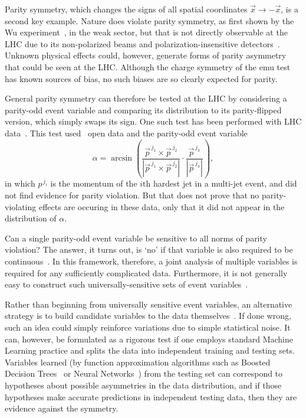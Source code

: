Parity symmetry, which changes the signs of all spatial coordinates
$\vec x\rightarrow -\vec x$, is a second key example.
Nature does violate parity symmetry, as first shown by the Wu
experiment~\cite{PhysRev.105.1413}, in the weak sector, but that is not
directly observable at the LHC due to its non-polarized beams and
polarization-insensitive detectors~\cite{Lester:2019bso}.
Unknown physical effects could, however, generate forms of parity asymmetry
that could be seen at the LHC.
Although the charge symmetry of the emu test has known sources of bias,
no such biases are so clearly expected for parity.

General parity symmetry can therefore be tested at the LHC by considering a
parity-odd event variable and comparing its distribution to its parity-flipped
version, which simply swaps its sign.
One such test has been performed with LHC data~\cite{Lester:2019bso}.
This test used \cms\ open data and the parity-odd event variable
\begin{equation}
\label{eqn:cms_alpha}
\alpha
= \arcsin\!
\left(
\frac{
\vec p^{\,j_1} \times \vec p^{\,j_2}
}{
|\vec p^{\,j_1} \times \vec p^{\,j_2}|
}
\cdot
\frac{
\vec p^{\,j_3}
}{
|\vec p^{\,j_3}|
}
\right)
,
\end{equation}
in which $p^{\,j_i}$ is the momentum of the $i$th hardest jet in a multi-jet
event,
and did not find evidence for parity violation.
But that does not prove that no parity-violating effects are occuring in these
data, only that it did not appear in the distribution of $\alpha$.

Can a single parity-odd event variable be sensitive to all norms of parity
violation?
The answer, it turns out, is `no' if that variable is also required to be
continuous~\cite{lesterChiralMeasurements2021}.
In this framework, therefore, a joint analysis of multiple variables is
required for any sufficiently complicated data.
Furthermore, it is not generally easy to construct such universally-sensitive
sets of event variables~\cite{
Gripaios:2020hya,
Lester:2020jrg
}.

Rather than beginning from universally sensitive event variables, an
alternative strategy is to build candidate variables to the data
themselves~\cite{lester2021stressed}.
If done wrong, such an idea could simply reinforce variations due to simple
statistical noise.
It can, however, be formulated as a rigorous test if one employs standard
Machine Learning practice and splits the data into independent training and
testing sets.
Variables learned (by function approximation algorithms such as
Boosted Decision Trees~\cite{xgboost} or
Neural Networks~\cite{MurphyKevinP.2012Mlap})
from the testing set can correspond to hypotheses about possible asymmetries
in the data distribution, and if those hypotheses make accurate predictions in
independent testing data, then they are evidence against the symmetry.

